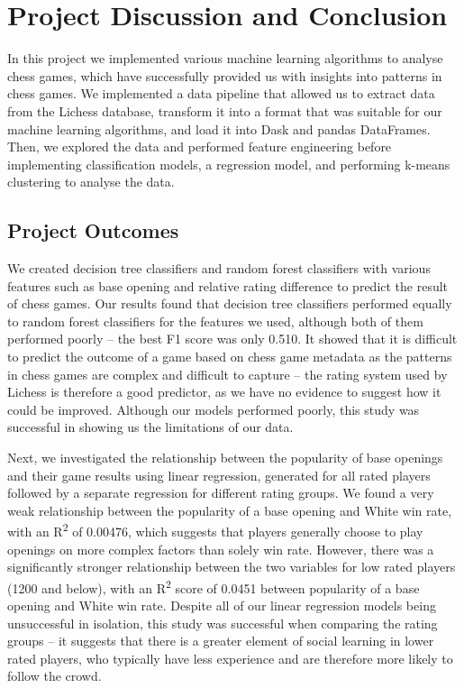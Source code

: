 \documentclass[a4paper, 11pt]{article}
\begin{document}
\section{Project Discussion and Conclusion}
In this project we implemented various machine learning algorithms to analyse chess games, which have successfully provided us with insights into patterns in chess games. We implemented a data pipeline that allowed us to extract data from the Lichess database, transform it into a format that was suitable for our machine learning algorithms, and load it into Dask and pandas DataFrames. Then, we explored the data and performed feature engineering before implementing classification models, a regression model, and performing k-means clustering to analyse the data.

\subsection{Project Outcomes}
We created decision tree classifiers and random forest classifiers with various features such as base opening and relative rating difference to predict the result of chess games. Our results found that decision tree classifiers performed equally to random forest classifiers for the features we used, although both of them performed poorly -- the best F1 score was only 0.510. It showed that it is difficult to predict the outcome of a game based on chess game metadata as the patterns in chess games are complex and difficult to capture -- the rating system used by Lichess is therefore a good predictor, as we have no evidence to suggest how it could be improved. Although our models performed poorly, this study was successful in showing us the limitations of our data.

Next, we investigated the relationship between the popularity of base openings and their game results using linear regression, generated for all rated players followed by a separate regression for different rating groups. We found a very weak relationship between the popularity of a base opening and White win rate, with an R\textsuperscript{2} of 0.00476, which suggests that players generally choose to play openings on more complex factors than solely win rate. However, there was a significantly stronger relationship between the two variables for low rated players (1200 and below), with an R\textsuperscript{2} score of 0.0451 between popularity of a base opening and White win rate. Despite all of our linear regression models being unsuccessful in isolation, this study was successful when comparing the rating groups -- it suggests that there is a greater element of social learning in lower rated players, who typically have less experience and are therefore more likely to follow the crowd.
\end{document}
